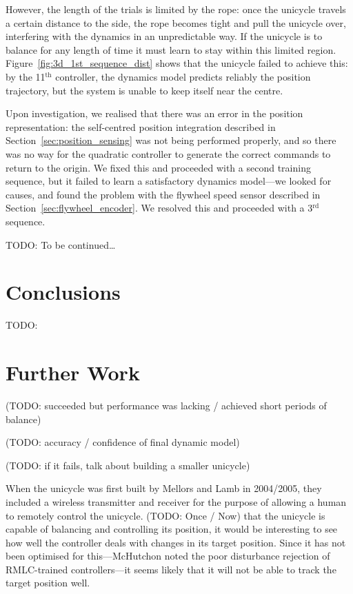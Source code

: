 \documentclass{IIBproject}
\begin{document}
However, the length of the trials is limited by the rope: once the unicycle
travels a certain distance to the side, the rope becomes tight and pull the
unicycle over, interfering with the dynamics in an unpredictable way. If the
unicycle is to balance for any length of time it must learn to stay within
this limited region. Figure~\ref{fig:3d_1st_sequence_dist} shows that the
unicycle failed to achieve this: by the 11$^\textrm{th}$ controller, the
dynamics model predicts reliably the position trajectory, but the system is
unable to keep itself near the centre.

Upon investigation, we realised that there was an error in the position
representation: the self-centred position integration described in
Section~\ref{sec:position_sensing} was not being performed properly, and so
there was no way for the quadratic controller to generate the correct commands
to return to the origin. We fixed this and proceeded with a second training
sequence, but it failed to learn a satisfactory dynamics model---we looked for
causes, and found the problem with the flywheel speed sensor described in
Section~\ref{sec:flywheel_encoder}. We resolved this and proceeded with a
3$^\textrm{rd}$ sequence.

TODO: To be continued\dots

\section{Conclusions}

TODO: 

\section{Further Work}

(TODO: succeeded but performance was lacking / achieved short periods of balance)

(TODO: accuracy / confidence of final dynamic model)

(TODO: if it fails, talk about building a smaller unicycle)

When the unicycle was first built by Mellors and Lamb in 2004/2005, they
included a wireless transmitter and receiver for the purpose of allowing a
human to remotely control the unicycle. 
(TODO: Once / Now) that the unicycle is capable of balancing and controlling its
position, it would be interesting to see how well the controller deals with
changes in its target position. Since it has not been optimised for
this---McHutchon noted the poor disturbance rejection of RMLC-trained
controllers---it seems likely that it will not be able to track the target
position well.
\end{document}
